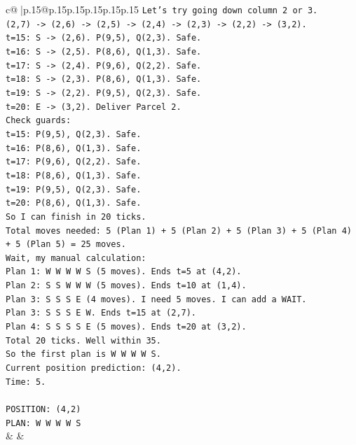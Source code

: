 \documentclass{article}
\begin{document}
{\begin{supertabular}{c@{$\;$}|p{.15\linewidth}@{}p{.15\linewidth}p{.15\linewidth}p{.15\linewidth}p{.15\linewidth}p{.15\linewidth}}
{{{\texttt{Let's try going down column 2 or 3.} \\
\texttt{(2,7) {-}> (2,6) {-}> (2,5) {-}> (2,4) {-}> (2,3) {-}> (2,2) {-}> (3,2).} \\
\texttt{t=15: S {-}> (2,6). P(9,5), Q(2,3). Safe.} \\
\texttt{t=16: S {-}> (2,5). P(8,6), Q(1,3). Safe.} \\
\texttt{t=17: S {-}> (2,4). P(9,6), Q(2,2). Safe.} \\
\texttt{t=18: S {-}> (2,3). P(8,6), Q(1,3). Safe.} \\
\texttt{t=19: S {-}> (2,2). P(9,5), Q(2,3). Safe.} \\
\texttt{t=20: E {-}> (3,2). Deliver Parcel 2.} \\
\texttt{Check guards:} \\
\texttt{t=15: P(9,5), Q(2,3). Safe.} \\
\texttt{t=16: P(8,6), Q(1,3). Safe.} \\
\texttt{t=17: P(9,6), Q(2,2). Safe.} \\
\texttt{t=18: P(8,6), Q(1,3). Safe.} \\
\texttt{t=19: P(9,5), Q(2,3). Safe.} \\
\texttt{t=20: P(8,6), Q(1,3). Safe.} \\
\texttt{So I can finish in 20 ticks.} \\
\texttt{Total moves needed: 5 (Plan 1) + 5 (Plan 2) + 5 (Plan 3) + 5 (Plan 4) + 5 (Plan 5) = 25 moves.} \\
\texttt{Wait, my manual calculation:} \\
\texttt{Plan 1: W W W W S (5 moves). Ends t=5 at (4,2).} \\
\texttt{Plan 2: S S W W W (5 moves). Ends t=10 at (1,4).} \\
\texttt{Plan 3: S S S E (4 moves). I need 5 moves. I can add a WAIT.} \\
\texttt{Plan 3: S S S E W. Ends t=15 at (2,7).} \\
\texttt{Plan 4: S S S S E (5 moves). Ends t=20 at (3,2).} \\
\texttt{Total 20 ticks. Well within 35.} \\
\texttt{So the first plan is W W W W S.} \\
\texttt{Current position prediction: (4,2).} \\
\texttt{Time: 5.} \\
\\ 
\texttt{POSITION: (4,2)} \\
\texttt{PLAN: W W W W S} \\
            }
        }
    }
    & & \\ \\


\end{supertabular}}
\end{document}
